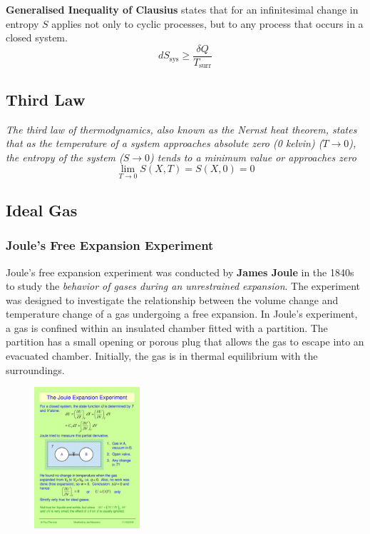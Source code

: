 \documentclass{article}
\begin{document}
\textbf{Generalised Inequality of Clausius} states that for an infinitesimal change in entropy $S$ applies not only to cyclic processes, but to any process that occurs in a closed system.
$$dS_{\text{sys}} \geq \frac{\delta Q}{{T_{\text{surr}}}}$$

 
 \subsection{Third Law}
 
\textit{\large The third law of thermodynamics, also known as the Nernst heat theorem, states that as the temperature of a system approaches absolute zero (0 kelvin) ($T \to 0$), the entropy of the system ($S \to 0 $) tends to a minimum value or approaches zero }
$$\lim_{{T \to 0}} S(X, T) = S(X, 0) = 0 $$

\subsection{Ideal Gas}
\subsubsection{Joule's Free Expansion Experiment}
\large 
Joule's free expansion experiment was conducted by \textbf{James Joule} in the 1840s to study the \textit{behavior of gases during an unrestrained expansion}. The experiment was designed to investigate the relationship between the volume change and temperature change of a gas undergoing a free expansion.
In Joule's experiment, a gas is confined within an insulated chamber fitted with a partition. The partition has a small opening or porous plug that allows the gas to escape into an evacuated chamber. Initially, the gas is in thermal equilibrium with the surroundings.






\begin{figure}
  \begin{center}
    \includegraphics[width=0.35\textwidth]{JOULE'S FREE EXPANSION Experiment.jpg}
  \end{center}

\end{figure}
\end{document}
